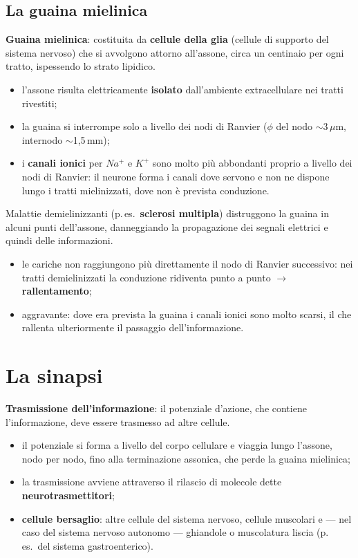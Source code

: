 \subsection{La guaina mielinica}

\textbf{Guaina mielinica}: costituita da \textbf{cellule della glia} (cellule di supporto del
sistema nervoso) che si avvolgono attorno all'assone, circa un centinaio per ogni tratto,
ispessendo lo strato lipidico.
\begin{itemize}
  \item l'assone risulta elettricamente \textbf{isolato} dall'ambiente extracellulare nei tratti
    rivestiti;
  \item la guaina si interrompe solo a livello dei nodi di Ranvier ($\phi$ del nodo $\sim$3\,$\mu$m,
    internodo $\sim$1,5\,mm);
  \item i \textbf{canali ionici} per $Na^+$ e $K^+$ sono molto più abbondanti proprio a livello dei
    nodi di Ranvier: il neurone forma i canali dove servono e non ne dispone lungo i tratti
    mielinizzati, dove non è prevista conduzione.
\end{itemize}

Malattie demielinizzanti (p.\,es.\ \textbf{sclerosi multipla}) distruggono la guaina in alcuni punti
dell'assone, danneggiando la propagazione dei segnali elettrici e quindi delle informazioni.
\begin{itemize}
  \item le cariche non raggiungono più direttamente il nodo di Ranvier successivo: nei tratti
    demielinizzati la conduzione ridiventa punto a punto $\rightarrow$ \textbf{rallentamento};
  \item aggravante: dove era prevista la guaina i canali ionici sono molto scarsi, il che rallenta
    ulteriormente il passaggio dell'informazione.
\end{itemize}

\section{La sinapsi}

\textbf{Trasmissione dell'informazione}: il potenziale d'azione, che contiene l'informazione, deve
essere trasmesso ad altre cellule.
\begin{itemize}
  \item il potenziale si forma a livello del corpo cellulare e viaggia lungo l'assone, nodo per
    nodo, fino alla terminazione assonica, che perde la guaina mielinica;
  \item la trasmissione avviene attraverso il rilascio di molecole dette
    \textbf{neurotrasmettitori};
  \item \textbf{cellule bersaglio}: altre cellule del sistema nervoso, cellule muscolari e --- nel
    caso del sistema nervoso autonomo --- ghiandole o muscolatura liscia (p.\,es.\ del sistema
    gastroenterico).
\end{itemize}
